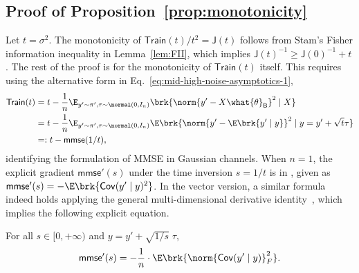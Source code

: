 \documentclass[11pt]{article}
\newcommand{\bysest}{\what{\theta}_{\mathsf{B}}}
\newcommand{\Cov}{\mathsf{Cov}}
\newcommand{\tfunc}{\mathsf{Train}}
\newcommand{\jfunc}{\mathsf{J}}
\newcommand{\mmse}{\mathsf{mmse}}
\begin{document}
\subsection{Proof of Proposition~\ref{prop:monotonicity}} \label{proof:monotonicity}
Let $t=\sigma^2$. The monotonicity of $\tfunc(t)/t^2 = \jfunc(t)$ follows from Stam's Fisher information inequality in Lemma~\ref{lem:FII}, which implies $\jfunc(t)^{-1} \geq \jfunc(0)^{-1} +t$. The rest of the proof is for the monotonicity of $\tfunc(t)$ itself. This requires using the alternative form in Eq.~\eqref{eq:mid-high-noise-asymptotics-1},
\begin{align*}
    \tfunc(t) & = t - \frac{1}{n} \E_{y' \sim \pi', \tau \sim \normal(0, I_n)}  \brk{\norm{y' - X \bysest}^2  \mid X} \nonumber \\
    &= t - \frac{1}{n} \E_{y' \sim \pi', \tau \sim \normal(0, I_n)} \E \brk{\norm{y' - \E \brk{y' \mid y}}^2  \mid y = y' + \sqrt{t} \tau} \nonumber \\
    & =: t - \mmse(1/t),
\end{align*}
identifying the formulation of MMSE in Gaussian channels. When $n=1$, the explicit gradient $\mmse'(s)$ under the time inversion $s = 1/t$ is in \cite[Cor.~2]{guo2011estimation}, given as $\mmse'(s) = -\E \brk{\Cov (y' \mid y)^2 }$. In the vector version, a similar formula indeed holds applying the general multi-dimensional derivative identity~\cite[Prop.~1]{dytso2020general}, which implies the following explicit equation.
\begin{lemma} \label{lemma:mmse-grad} For all $s \in [0, +\infty)$ and $y = y'+ \sqrt{1/s}\; \tau$,
$$\mmse'(s) = - \frac{1}{n} \cdot \E \brk{\norm{\Cov (y' \mid y)}_F^2}.$$
\end{lemma}
\end{document}
